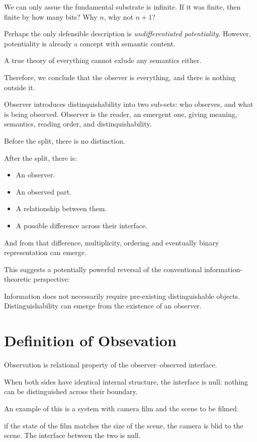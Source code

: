 We can only assue the fundamental substrate is infinite. If it was finite, then finite by how many bits?  Why $n$, why not $n+1$?

Perhaps the only defensible description is \textit{undifferentiated potentiality}. However, potentiality is already a concept with semantic content.

A true theory of everything cannot exlude any semantics either.

Therefore, we conclude that the obsever is everything, and there is nothing outside it. 

Observer introduces distinquishability into two sub-sets: who observes, and what is being observed.
Observer is the reader, an emergent one, giving meaning, semantics, reading order, and distinquishability. 


Before the split, there is no distinction.

After the split, there is:
\begin{itemize}
\item An observer.
\item An observed part.
\item  A relationship between them.
\item A possible difference across their interface.
\end{itemize}

And from that difference, multiplicity, ordering and eventually binary representation can emerge.

This suggests a potentially powerful reversal of the conventional information-theoretic perspective:

Information does not necessarily require pre-existing distinguishable objects. Distinguishability can emerge from the existence of an observer.

\section{Definition of Obsevation}

Observation is relational property of the observer–observed interface.

When both sides have identical internal structure, the interface is null: nothing can be distinguished across their boundary.

An example of this is a system with camera film and the scene to be filmed.

if the state of the film matches the size of the scene, the camera is blid to the scene. The
interface between the two is null.

